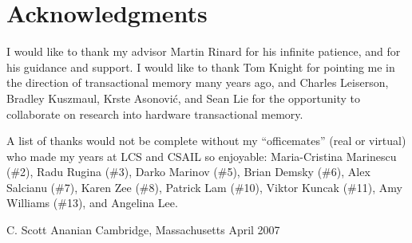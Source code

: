 \clearpage
\section*{Acknowledgments}

I would like to thank my advisor Martin Rinard for his infinite
patience, and for his guidance and support.  I would like to thank Tom
Knight for pointing me in the direction of transactional memory many
years ago, and Charles Leiserson, Bradley Kuszmaul, Krste Asonovi\'c,
and Sean Lie for the opportunity to collaborate on research into
hardware transactional memory.

A list of thanks would not be complete without
my ``officemates'' (real or virtual) who made my
years at LCS and CSAIL so enjoyable: Maria-Cristina Marinescu (\#2),
Radu Rugina (\#3), Darko Marinov (\#5), Brian Demsky (\#6), Alex
Salcianu (\#7), Karen Zee (\#8), Patrick Lam (\#10), Viktor Kuncak (\#11), 
Amy Williams (\#13), and Angelina Lee.

\begin{flushright}
C. Scott Ananian\tight
Cambridge, Massachusetts\tight
April 2007
\end{flushright}
